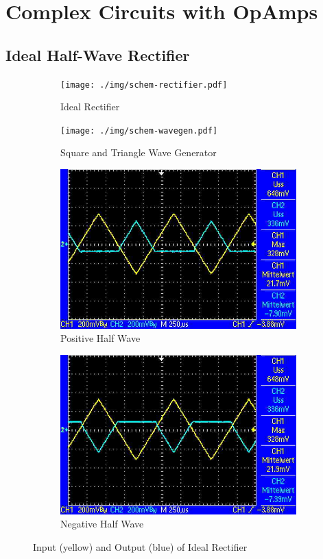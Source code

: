 \chapter{Complex Circuits with OpAmps}
\section{Ideal Half-Wave Rectifier}

\begin{figure}
	\centering
	\begin{subfigure}{0.44\textwidth}
		\centering
		\texttt{[image: ./img/schem-rectifier.pdf]}
		\caption{Ideal Rectifier}
		\label{schem:rectifier}
	\end{subfigure}
	\begin{subfigure}{0.55\textwidth}
		\centering
		\texttt{[image: ./img/schem-wavegen.pdf]}
		\caption{Square and Triangle Wave Generator}
		\label{schem:wavegen}
	\end{subfigure}
	\caption{}
\end{figure}

\begin{figure}
	\centering
	\begin{subfigure}{0.4\textwidth}
		\centering
		\includegraphics[width=.9\linewidth]{./img/ss-rect-pos}
		\caption{Positive Half Wave}
	\end{subfigure}
	\begin{subfigure}{0.4\textwidth}
		\centering
		\includegraphics[width=.9\linewidth]{./img/ss-rect-neg}
		\caption{Negative Half Wave}
	\end{subfigure}
	\caption{Input (yellow) and Output (blue) of Ideal Rectifier}
	\label{ss:rect}
\end{figure}

